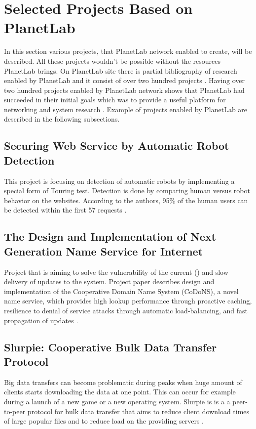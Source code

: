\section{Selected Projects Based on PlanetLab}
In this section various projects, that PlanetLab network enabled to create, will be described. All these projects wouldn't be possible without the resources PlanetLab brings. On PlanetLab site there is partial bibliography of research enabled by PlanetLab and it consist of over two hundred projects \cite{planetlabmain}. Having over two hundred projects enabled by PlanetLab network shows that PlanetLab had succeeded in their initial goals which was to provide a useful platform for networking and system research \cite{Roscoe_PDN-02-002}. Example of projects enabled by PlanetLab are described in the following subsections.
\subsection{Securing Web Service by Automatic Robot Detection}
This project is focusing on detection of automatic robots by implementing a special form of Touring test. Detection is done by comparing human versus robot behavior on the websites. According to the authors, 95\% of the human users can be detected within the first 57 requests \cite{Park:2006:SWS:1267359.1267382}.
\subsection{The Design and Implementation of Next Generation Name Service for Internet}
Project that is aiming to solve the vulnerability of the current  () and slow delivery of updates to the system. Project paper describes design and implementation of the Cooperative Domain Name System (CoDoNS), a novel name service, which provides high lookup performance through proactive caching, resilience to denial of service attacks through automatic load-balancing, and fast propagation of updates \cite{Ramasubramanian:2004:DIN:1030194.1015504}.
\subsection{Slurpie: Cooperative Bulk Data Transfer Protocol}
Big data transfers can become problematic during peaks when huge amount of clients starts downloading the data at one point. This can occur for example during a launch of a new game or a new operating system. Slurpie is is a  a peer-to-peer protocol for bulk data transfer that aims to reduce client download times of large popular files and to reduce load on the providing servers \cite{1356981}. 

